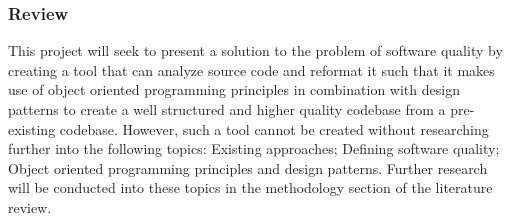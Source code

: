 \subsubsection{Review}
This project will seek to present a solution to the problem of software quality by creating a tool that can analyze source code and reformat it such that it makes use of object oriented programming principles in combination with design patterns to create a well structured and higher quality codebase from a pre-existing codebase.
However, such a tool cannot be created without researching further into the following topics: Existing approaches; Defining software quality; Object oriented programming principles and design patterns. Further research will be conducted into these topics in the methodology section of the literature review.
